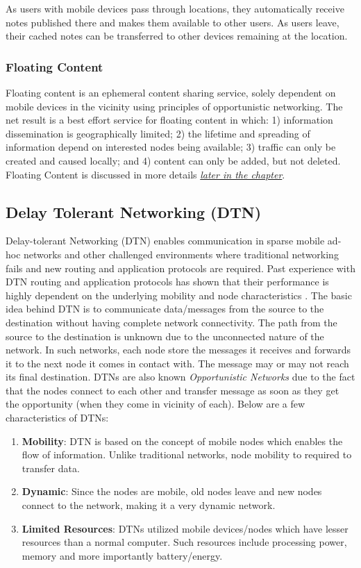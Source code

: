 As users with mobile devices pass through locations, they automatically receive notes published there and makes them available to other users. As users leave, their cached notes can be transferred to other devices remaining at the location.


\subsubsection{Floating Content \cite{floating-content}}
Floating content is an ephemeral content sharing service, solely dependent on mobile devices in the vicinity using principles of opportunistic networking. The net result is a best effort service for floating content in which: 1) information dissemination is geographically limited; 2) the lifetime and spreading of information depend on interested nodes being available; 3) traffic can only be created and caused locally; and 4) content can only be added, but not deleted. Floating Content is discussed in more details \hyperref[section:floating-content]{\emph{later in the chapter}}.

\subsection{Delay Tolerant Networking (DTN)}
Delay-tolerant Networking (DTN) enables communication in sparse mobile ad-hoc networks and other challenged environments where traditional networking fails and new routing and application protocols are required. Past experience with DTN routing and application protocols has shown that their performance is highly dependent on the underlying mobility and node characteristics \cite{keranen-theone}. The basic idea behind DTN is to communicate data/messages from the source to the destination without having complete network connectivity. The path from the source to the destination is unknown due to the unconnected nature of the network. In such networks, each node store the messages it receives and forwards it to the next node it comes in contact with. The message may or may not reach its final destination.\newline
DTNs are also known \textit{Opportunistic Networks} due to the fact that the nodes connect to each other and transfer message as soon as they get the opportunity (when they come in vicinity of each). Below are a few characteristics of DTNs:
\begin{enumerate}
  \item \textbf{Mobility}: DTN is based on the concept of mobile nodes which enables the flow of information. Unlike traditional networks, node mobility to required to transfer data.
  \item \textbf{Dynamic}: Since the nodes are mobile, old nodes leave and new nodes connect to the network, making it a very dynamic network.
  \item \textbf{Limited Resources}: DTNs utilized mobile devices/nodes which have lesser resources than a normal computer. Such resources include processing power, memory and more importantly battery/energy.
\end{enumerate}

